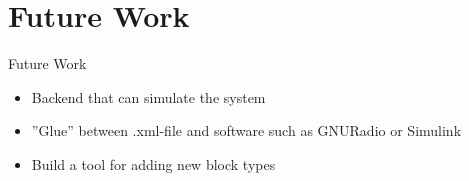 \documentclass{beamer}
\begin{document}
\section{Future Work}
\begin{frame}{Future Work}
	\begin{itemize}
		\item<2-> Backend that can simulate the system
		\item<3-> ''Glue'' between .xml-file and software such as GNURadio or Simulink
		\item<4-> Build a tool for adding new block types
	\end{itemize}
\end{frame}
\end{document}
